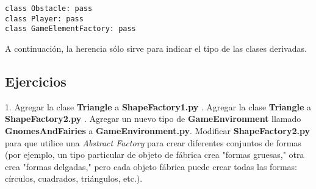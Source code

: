 \begin{lstlisting} 
class Obstacle: pass 
class Player: pass 
class GameElementFactory: pass 
\end{lstlisting}

A continuación, la herencia sólo sirve  para indicar el tipo de las clases derivadas.   \newline


\subsection*{Ejercicios}
\label{subsec:eje}


1. Agregar la clase \textbf{Triangle} a \textbf{ShapeFactory1.py} . Agregar la clase \textbf{Triangle} a \textbf{ShapeFactory2.py} . Agregar un nuevo tipo de \textbf{GameEnvironment} llamado \textbf{GnomesAndFairies} a \textbf{GameEnvironment.py}. Modificar \textbf{ShapeFactory2.py} para que utilice una \textit{Abstract Factory} para crear diferentes conjuntos de formas (por ejemplo, un tipo particular de objeto de fábrica crea "formas gruesas," otra crea "formas delgadas," pero cada objeto fábrica puede crear todas las formas: círculos, cuadrados, triángulos, etc.).     \newline